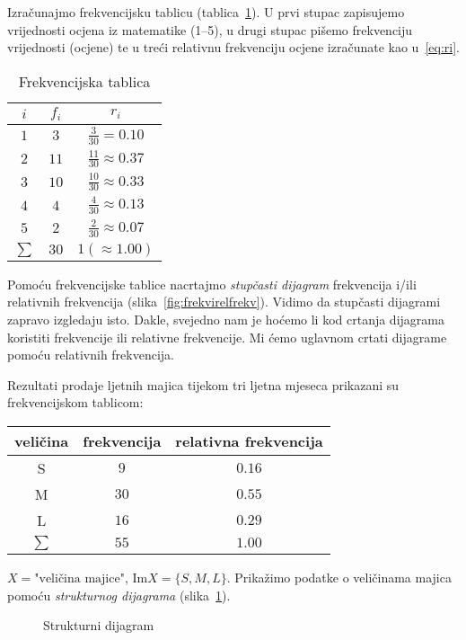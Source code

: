 \documentclass[12pt]{scrartcl}
\newcommand{\im}{\mathrm{Im}}
\begin{document}
\begin{primjer}
\noindent Izračunajmo frekvencijsku tablicu (tablica~\ref{tbl:frekvencijska}). U prvi stupac zapisujemo vrijednosti ocjena iz matematike (1--5), u drugi stupac pišemo frekvenciju vrijednosti (ocjene) te u treći relativnu frekvenciju ocjene izračunate kao u~\eqref{eq:ri}.
\begin{table}[ht]
\centering
\begin{tabular}{ccc}
\hline
$i$       & $f_i$  & $r_i$ \\ \hline
$1$       & $3$    & $\frac{3}{30}=0.10$ \\
$2$       & $11$   & $\frac{11}{30}\approx 0.37$ \\ 
$3$       & $10$   & $\frac{10}{30}\approx0.33$ \\
$4$       & $4$    & $\frac{4}{30}\approx0.13$ \\
$5$       & $2$    & $\frac{2}{30}\approx0.07$ \\ \hline
$\sum$    & $30$   & $1(\approx1.00)$ \\   \hline
\end{tabular}
\caption{Frekvencijska tablica}
\label{tbl:frekvencijska}
\end{table}
Pomoću frekvencijske tablice nacrtajmo \emph{stupčasti dijagram} frekvencija i/ili relativnih frekvencija (slika~\ref{fig:frekvirelfrekv}). Vidimo da stupčasti dijagrami zapravo izgledaju isto. Dakle, svejedno nam je hoćemo li kod crtanja dijagrama koristiti frekvencije ili relativne frekvencije. Mi ćemo uglavnom crtati dijagrame pomoću relativnih frekvencija.
\end{primjer}
%
\begin{primjer}
Rezultati prodaje ljetnih majica tijekom tri ljetna mjeseca prikazani su frekvencijskom tablicom:
\begin{center}
\begin{tabular}{ccc}
\hline
veličina & frekvencija & relativna frekvencija \\ \hline
S        & $9$         & $0.16$                \\
M        & $30$        & $0.55$                \\
L        & $16$        & $0.29$                \\ \hline
$\sum$   & $55$        & $1.00$                \\ \hline
\end{tabular}
\end{center}
$X=\text{"veličina majice"}$, $\im X=\{S,M,L\}$.
Prikažimo podatke o veličinama majica pomoću \emph{strukturnog dijagrama} (slika~\ref{fig:struktdij}).
\begin{figure}[ht]
    \centering
    \caption{Strukturni dijagram}
    \label{fig:struktdij}
\end{figure}
\end{primjer}
\end{document}
